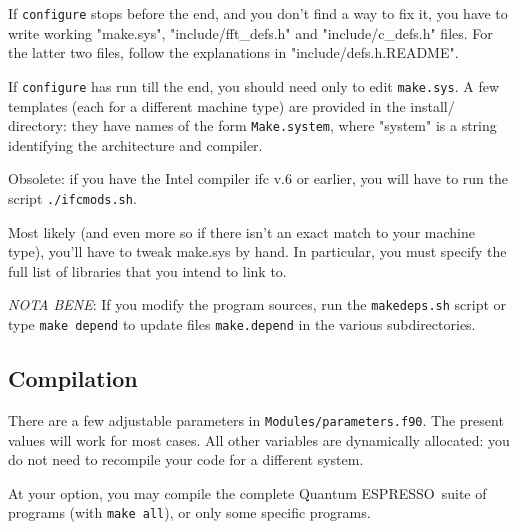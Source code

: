 \documentclass[12pt,a4paper]{article}
\def\qe{{\sc Quantum ESPRESSO}}
\begin{document}
If \texttt{configure} stops before the end, and you don't find a way to fix
it, you have to write working "make.sys", "include/fft\_defs.h" and
"include/c\_defs.h" files. 
For the latter two files, follow the explanations in 
"include/defs.h.README". 

If \texttt{configure} has run till the end, you should need only to
edit \texttt{make.sys}. A few templates (each for a different machine type)
are provided in the install/ directory: they have names of the
form \texttt{Make.system}, where "system" is a string identifying the 
architecture and compiler.

Obsolete: if you have the Intel compiler ifc v.6 or earlier, you will have to 
run the script \texttt{./ifcmods.sh}.
  
Most likely (and even more so if there isn't an exact match to your 
machine type), you'll have to tweak make.sys by hand. In particular, 
you must
specify the full list of libraries that you intend to link to.
    
{\em NOTA BENE}:
If you modify the program sources, run the
\texttt{makedeps.sh}  script  or type \texttt{make depend} 
to update files \texttt{make.depend} in the various 
subdirectories.

\subsection{Compilation}

There are a few adjustable parameters in \texttt{Modules/parameters.f90}. 
The
present values will work for most cases. All other variables are dynamically
allocated: you do not need to recompile your code for a different system.
    
At your option, you may compile the complete \qe\ suite of programs 
(with \texttt{make all}), or only some specific programs.
\end{document}
